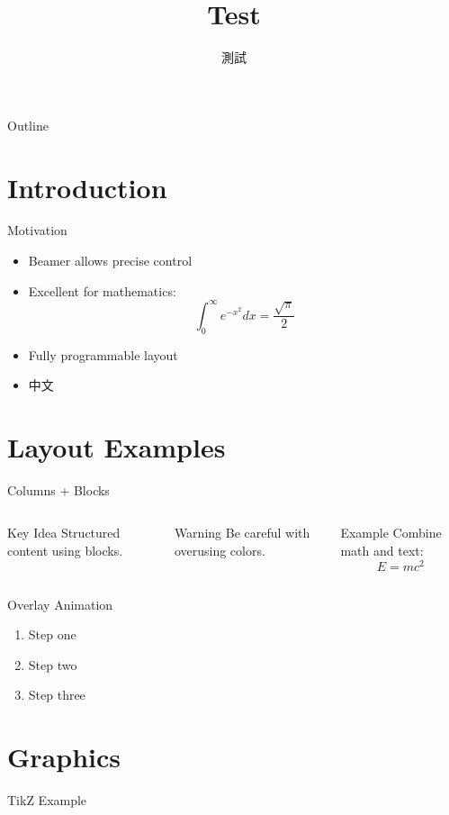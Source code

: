 \documentclass[aspectratio=169]{beamer}
\title{Test}
\author{測試}
\date{\zhtoday}
\begin{document}
\begin{frame}
  \titlepage
\end{frame}
\begin{frame}{Outline}
  \tableofcontents
\end{frame}
\section{Introduction}
\begin{frame}{Motivation}
\begin{itemize}
  \item<1-> Beamer allows precise control
  \item<2-> Excellent for mathematics:
  \[
    \int_0^\infty e^{-x^2} dx = \frac{\sqrt{\pi}}{2}
  \]
  \item<3-> Fully programmable layout
  \item<4-> 中文
\end{itemize}
\end{frame}
\section{Layout Examples}
\begin{frame}{Columns + Blocks}
\begin{columns}
  \begin{block}{Key Idea}
    Structured content using blocks.
  \end{block}
  \begin{alertblock}{Warning}
    Be careful with overusing colors.
  \end{alertblock}
  \begin{exampleblock}{Example}
    Combine math and text:
    \[
      E = mc^2
    \]
  \end{exampleblock}
\end{columns}
\end{frame}
\begin{frame}{Overlay Animation}
\begin{enumerate}
  \item<1-> Step one
  \item<2-> Step two
  \item<3-> Step three
\end{enumerate}
\end{frame}
\section{Graphics}
\begin{frame}{TikZ Example}
\centering
{}
\end{frame}
\end{document}
